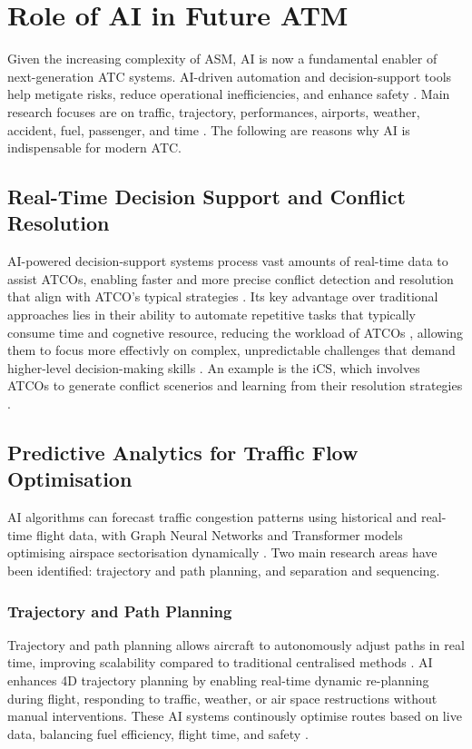 \section{Role of AI in Future ATM}

Given the increasing complexity of \gls{ASM}, \gls{AI} is now a fundamental enabler of next-generation \gls{ATC} systems. 
\gls{AI}-driven automation and decision-support tools help metigate risks, reduce operational inefficiencies, and enhance safety \cite{Ramachandran_2025}.
Main research focuses are on traffic, trajectory, performances, airports, weather, accident, fuel, passenger, and time \cite{Tafur_2025}.
The following are reasons why \gls{AI} is indispensable for modern \gls{ATC}.


\subsection{Real-Time Decision Support and Conflict Resolution}

\gls{AI}-powered decision-support systems process vast amounts of real-time data to assist \glspl{ATCO}, enabling faster and more precise conflict detection and resolution that align with \gls{ATCO}'s typical strategies \cite{Ramachandran_2025}.
Its key advantage over traditional approaches lies in their ability to automate repetitive tasks that typically consume time and cognetive resource, reducing the workload of \glspl{ATCO} , allowing them to focus more effectivly on complex, unpredictable challenges that demand higher-level decision-making skills \cite{Meier_2024}. 
An example is the \gls{iCS}, which involves \glspl{ATCO} to generate conflict scenerios and learning from their resolution strategies \cite{Meier_2024}.



\subsection{Predictive Analytics for Traffic Flow Optimisation}
\gls{AI} algorithms can forecast traffic congestion patterns using historical and real-time flight data, with Graph Neural Networks and Transformer models optimising airspace sectorisation dynamically \cite{Ramachandran_2025}. 
Two main research areas have been identified: trajectory and path planning, and separation and sequencing.

\subsubsection{Trajectory and Path Planning}
Trajectory and path planning allows aircraft to autonomously adjust paths in real time, improving scalability compared to traditional centralised methods \cite{Tafur_2025}.
\gls{AI} enhances 4D trajectory planning by enabling real-time dynamic re-planning during flight, responding to traffic, weather, or air space restructions without manual interventions. 
These \gls{AI} systems continously optimise routes based on live data, balancing fuel efficiency, flight time, and safety \cite{Meier_2024}.

